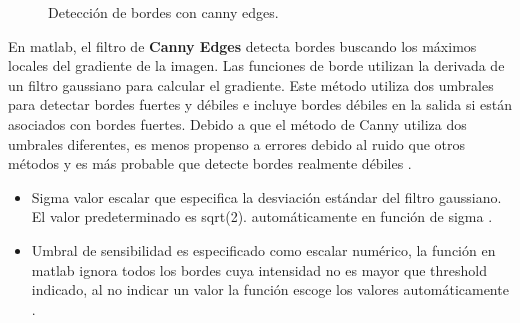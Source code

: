 \documentclass[a4paper, 11pt]{article}
\begin{document}
\begin{itemize}
  \begin{figure}[ht]%
    \centering
    \qquad
    \caption{Detección de bordes con canny edges.}%
    \label{canny}%
  \end{figure}
  
\end{itemize}

En matlab, el filtro de \textbf{Canny Edges} detecta bordes buscando los máximos locales del gradiente de la imagen. Las funciones de borde utilizan la derivada de un filtro gaussiano para calcular el gradiente. Este método utiliza dos umbrales para detectar bordes fuertes y débiles e incluye bordes débiles en la salida si están asociados con bordes fuertes. Debido a que el método de Canny utiliza dos umbrales diferentes, es menos propenso a errores debido al ruido que otros métodos y es más probable que detecte bordes realmente débiles \cite{canny}.

\begin{itemize}
\item Sigma valor escalar que especifica la desviación estándar del filtro gaussiano. El valor predeterminado es sqrt(2).  automáticamente en función de sigma \cite{canny}.

\item Umbral de sensibilidad es especificado como escalar numérico, la función en matlab ignora todos los bordes cuya intensidad no es mayor que threshold indicado, al no indicar un valor la función escoge los valores automáticamente \cite{canny}.
\end{itemize}
\end{document}
